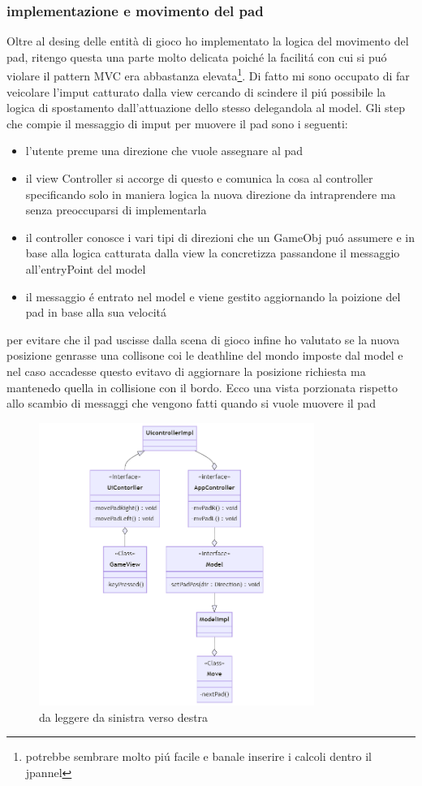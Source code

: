 \documentclass[a4paper,12pt]{report}
\begin{document}
\subsubsection{implementazione e movimento del pad}
Oltre al desing delle entità di gioco ho implementato la logica del movimento del pad, ritengo questa una parte
molto delicata poiché la facilitá con cui si puó violare il pattern MVC era abbastanza elevata\footnote{potrebbe sembrare molto piú facile e banale inserire i calcoli dentro il jpannel}.
Di fatto mi sono occupato di far veicolare l'imput catturato dalla view cercando di scindere il piú possibile
la logica di spostamento dall'attuazione dello stesso delegandola al model.
Gli step che compie il messaggio di imput per muovere il pad sono i seguenti:
\begin{itemize}
    \item l'utente preme una direzione che vuole assegnare al pad
    \item il view Controller si accorge di questo e comunica la cosa al controller specificando solo in maniera logica
          la nuova direzione da intraprendere ma senza preoccuparsi di implementarla
    \item il controller conosce i vari tipi di direzioni che un GameObj puó assumere e in base alla logica catturata
          dalla view la concretizza passandone il messaggio all'entryPoint del model
    \item  il messaggio é entrato nel model e viene gestito aggiornando la poizione del pad in base alla sua velocitá
\end{itemize}

per evitare che il pad uscisse dalla scena di gioco infine ho valutato se la nuova posizione genrasse una collisone coi
le deathline del mondo imposte dal model e nel caso accadesse questo evitavo di aggiornare la posizione richiesta ma mantenedo
quella in collisione con il bordo.
Ecco una vista porzionata rispetto allo scambio di messaggi che vengono fatti quando si vuole muovere il pad
\begin{figure}[H]
    \centering
    \includegraphics[width=0.8\textwidth]{images/padInput.png}
    \caption{da leggere da sinistra verso destra}
\end{figure}
\end{document}
